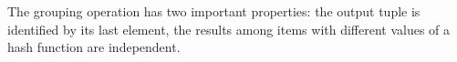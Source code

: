 The grouping operation has  two important properties: the output tuple is identified by its last element, the results among items with different values of a hash function are independent.




